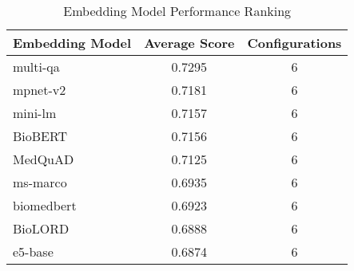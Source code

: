 \begin{table}[!htbp]
\centering
\begin{small}
\renewcommand\arraystretch{1.1}
\begin{tabular}{|l|c|c|}
\hline
\textbf{Embedding Model} & \textbf{Average Score} & \textbf{Configurations} \\
\hline
multi-qa & 0.7295 & 6 \\
mpnet-v2 & 0.7181 & 6 \\
mini-lm & 0.7157 & 6 \\
BioBERT & 0.7156 & 6 \\
MedQuAD & 0.7125 & 6 \\
ms-marco & 0.6935 & 6 \\
biomedbert & 0.6923 & 6 \\
BioLORD & 0.6888 & 6 \\
e5-base & 0.6874 & 6 \\
\hline
\end{tabular}
\end{small}
\caption{Embedding Model Performance Ranking}
\label{tab:embedding_ranking}
\end{table}
